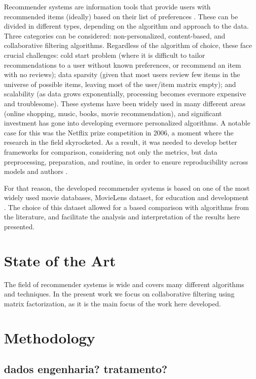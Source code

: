 \documentclass[conference]{IEEEtran}
\begin{document}
Recommender systems are information tools that provide users with recommended items (ideally) based on their list of preferences \cite{Konstan2012,KATARYA2017105}. These can be divided in different types, depending on the algorithm and approach to the data. Three categories can be considered: non-personalized, content-based, and collaborative filtering algorithms. Regardless of the algorithm of choice, these face crucial challenges: cold start problem (where it is difficult to tailor recommendations to a user without known preferences, or recommend an item with no reviews); data sparsity (given that most users review few items in the universe of possible items, leaving most of the user/item matrix empty); and scalability (as data grows exponentially, processing becomes evermore expensive and troublesome). These systems have been widely used in many different areas (online shopping, music, books, movie recommendation), and significant investment has gone into developing evermore personalized algorithms. A notable case for this was the Netflix prize competition in 2006, a moment where the research in the field skyrocketed. As a result, it was needed to develop better frameworks for comparison, considering not only the metrics, but data preprocessing, preparation, and routine, in order to ensure reproducibility across models and authors \cite{10.1145/2645710.2645746}.

For that reason, the developed recommender systems is based on one of the most widely used movie databases, MovieLens dataset, for education and development \cite{Harper2015}. The choice of this dataset allowed for a based comparison with algorithms from the literature, and facilitate the analysis and interpretation of the results here presented. 

\section{State of the Art}

The field of recommender systems is wide and covers many different algorithms and techniques. In the present work we focus on collaborative filtering using matrix factorization, as it is the main focus of the work here developed.

\section{Methodology}


\subsection{dados engenharia? tratamento?}
\end{document}
